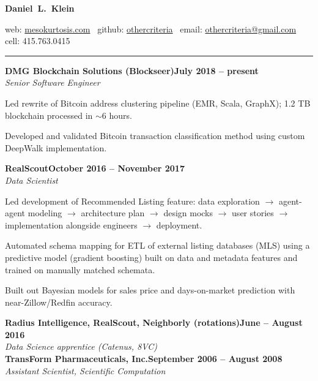 \documentclass{article}
\newcommand{\ressection}[1]{\noindent{\large\textbf{#1}}\vspace{2pt}\hrule\vspace{4pt}}
\newcommand{\leftandright}[2]{\noindent\textbf{#1}\hfill\textbf{#2}}
\begin{document}
\sffamily

\begin{center}
\textbf{\huge{Daniel~L.~Klein}}

web: \href{http://mesokurtosis.com}{mesokurtosis.com}
\textbullet\, github: \href{https://github.com/othercriteria}{othercriteria}
\textbullet\, email: \href{mailto:othercriteria@gmail.com}{othercriteria@gmail.com}
\textbullet\, cell: 415.763.0415
\end{center}

\ressection{Work experience}

\leftandright{DMG Blockchain Solutions (Blockseer)}{July 2018 -- present} \\
\textit{Senior Software Engineer}

\begin{itemize*}
\item Led rewrite of Bitcoin address clustering pipeline (EMR, Scala,
  GraphX); 1.2 TB blockchain processed in $\sim$6 hours.
\item Developed and validated Bitcoin transaction classification
  method using custom DeepWalk implementation.
\end{itemize*}

\leftandright{RealScout}{October 2016 -- November 2017} \\
\textit{Data Scientist}

\begin{itemize*}
\item Led development of Recommended Listing feature: data exploration
  $\rightarrow$ agent-agent modeling $\rightarrow$ architecture plan
  $\rightarrow$ design mocks $\rightarrow$ user stories $\rightarrow$
  implementation alongside engineers $\rightarrow$ deployment.
\item Automated schema mapping for ETL of external listing databases
  (MLS) using a predictive model (gradient boosting) built on data
  and metadata features and trained on manually matched schemata.
\item Built out Bayesian models for sales price and days-on-market
  prediction with near-Zillow/Redfin accuracy.
\end{itemize*}

\leftandright{Radius Intelligence, RealScout, Neighborly (rotations)}{June -- August 2016} \\
\textit{Data Science apprentice (Catenus, 8VC)} \\

\leftandright{TransForm Pharmaceuticals, Inc.}{September 2006 -- August 2008} \\
\textit{Assistant Scientist, Scientific Computation}
\end{document}
